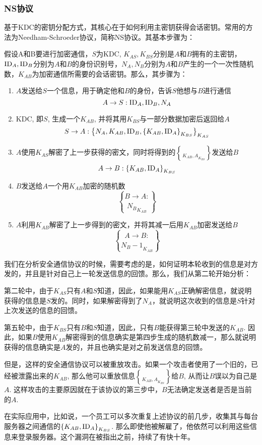 \subsubsection{NS协议}
基于KDC的密钥分配方式，其核心在于如何利用主密钥获得会话密钥。常用的方法为Needham-Schroeder协议，简称NS协议。其基本步骤为：\par
假设A和B要进行加密通信，$S$为KDC, $K_{AS}, K_{BS}$分别是$A$和$B$拥有的主密钥，$\mathrm{ID}_A, \mathrm{ID}_B$分别为$A$和$B$的身份识别号，$N_A, N_B$分别为$A$和$B$产生的一个一次性随机数，$K_{AB}$为加密通信所需要的会话密钥。那么，其步骤为：
\begin{enumerate}
	\item $A$发送给$S$一个信息，用于确定他和$B$的身份，告诉$S$他想与$B$进行通信
	\[A\to S: \mathrm{ID}_A, \mathrm{ID}_B, N_A\]
	\item KDC, 即$S$, 生成一个$K_{AB}$, 并将其用$K_{BS}$与一部分数据加密后返回给$A$
	\[S\to A: \left\{ {N_A, K_{AB}, \mathrm{ID}_B, \left\{ {K_{AB}, \mathrm{ID}_A} \right\}_{K_{BS}}} \right\}_{K_{AS}}\]
	\item $A$使用$K_{AS}$解密了上一步获得的密文，同时将得到的$\brace{K_{AB}, A}_{K_{BS}}$发送给$B$
	\[A\to B: \left\{ {K_{AB}, \mathrm{ID}_A} \right\}_{K_{BS}}\]
	\item $B$发送给$A$一个用$K_{AB}$加密的随机数
	\[B\to A: \brace{N_B}_{K_{AB}}\]
	\item $A$利用$K_{AB}$解密了上一步得到的密文，并将其减一后用$K_{AB}$加密发送给$B$
	\[A\to B: \brace{N_B - 1}_{K_{AB}}\]
\end{enumerate}

我们在分析安全通信协议的时候，需要考虑的是，如何证明本轮收到的信息是对方发的，并且是针对自己上一轮发送信息的回馈。那么，我们从第二轮开始分析：\par
第二轮中，由于$K_{AS}$只有$A$和$S$知道，因此，如果能用$K_{AS}$正确解密信息，就说明获得的信息是$S$发的。同时，如果解密得到了$N_A$，就说明这次收到的信息是$S$针对上次发送的信息的回馈。\par
第五轮中，由于$K_{BS}$只有$B$和$S$知道，因此，只有$B$能获得第三轮中发送的$K_{AB}$. 因此，如果$B$使用$K_{AB}$解密得到的信息确实是第四步生成的随机数减一，那么就说明获得的信息确实是$A$发的，并且也确实是对之前发送信息的回馈。\par
但是，这样的安全通信协议可以被重放攻击。如果一个攻击者使用了一个旧的，已经被泄露出来的$K_{AB}$, 那么他可以重放信息$\brace{K_{AB}, A}_{K_{BS}}$给$B$, 从而让$B$误以为自己是$A$. 这样攻击的主要原因就在于该协议的第三步中，$B$无法确定发送者是否是当前的$A$.\par
在实际应用中，比如说，一个员工可以多次重复上述协议的前几步，收集其与每台服务器之间通信的$\left\{ {K_{AB}, \mathrm{ID}_A} \right\}_{K_{BS}}$. 那么即使他被解雇了，他依然可以利用这些信息来登录服务器。这个漏洞在被指出之前，持续了有快十年。

